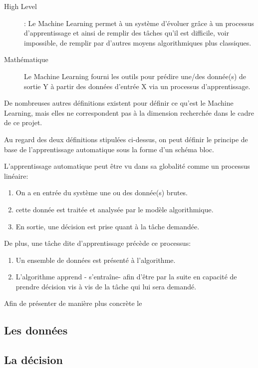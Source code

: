 \begin{description}
	\item[High Level]: Le Machine Learning permet à un système d'évoluer grâce à un processus d'apprentissage et ainsi de remplir des tâches qu'il est difficile, voir impossible, de remplir par d'autres moyens algorithmiques plus classiques. 
	\item[Mathématique] Le Machine Learning fourni les outils pour prédire une/des donnée(s) de sortie Y à partir des données d'entrée X via un processus d'apprentissage. 
\end{description}
 
 De nombreuses autres définitions existent pour définir ce qu'est le Machine Learning, mais elles ne correspondent pas à la dimension recherchée dans le cadre de ce projet.
 
Au regard des deux définitions stipulées ci-dessus, on peut définir le principe de base de l'apprentissage automatique sous la forme d'un schéma bloc.

L'apprentissage automatique peut être vu dans sa globalité comme un processus linéaire: 
\begin{enumerate}
	\item  On a en entrée du système une ou des donnée(s) brutes.  
	\item cette donnée est traitée et analysée par le modèle algorithmique.
	\item En sortie, une décision est prise quant à la tâche demandée. 
\end{enumerate}

De plus, une tâche  dite d'apprentissage précède ce processus: 
\begin{enumerate}
	\item  Un ensemble de données est présenté à l'algorithme.
	\item L'algorithme apprend - s'entraîne- afin d'être par la suite  en capacité de prendre décision vis à vis de la tâche qui lui sera demandé. 

\end{enumerate}

Afin de présenter de manière plus concrète le 
\subsection{Les données}
\label{Le Machine Learning: Généralités sur le Machine Learning: Les données}

\subsection{La décision}
\label{Le Machine Learning: Généralités sur le Machine Learning: La décision}

